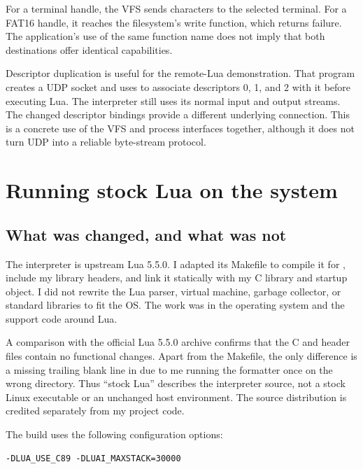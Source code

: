 \documentclass[11pt,a4paper]{scrartcl}
\newcommand{\code}[1]{\texttt{\detokenize{#1}}}
\begin{document}
For a terminal handle, the VFS sends characters to the selected terminal.
For a FAT16 handle, it reaches the filesystem's write function, which
returns failure. The application's use of the same function name does
not imply that both destinations offer identical capabilities.

Descriptor duplication is useful for the remote-Lua demonstration. That
program creates a UDP socket and uses \code{dup2} to associate descriptors
0, 1, and 2 with it before executing Lua. The interpreter still uses its
normal input and output streams. The changed descriptor bindings provide
a different underlying connection. This is a concrete use of the VFS and
process interfaces together, although it does not turn UDP into a reliable
byte-stream protocol.

\section{Running stock Lua on the system}
\label{sec:lua}

\subsection{What was changed, and what was not}

The interpreter is upstream Lua 5.5.0. I adapted its Makefile to compile
it for \code{i386-elf}, include my library headers, and link it statically
with my C library and startup object. I did not rewrite the Lua parser,
virtual machine, garbage collector, or standard libraries to fit the OS.
The work was in the operating system and the support code around Lua.

A comparison with the official Lua 5.5.0 archive confirms that the C and
header files contain no functional changes. Apart from the Makefile, the
only difference is a missing trailing blank line in \code{luaconf.h}
due to me running the formatter once on the wrong directory.
Thus ``stock Lua'' describes the interpreter source, not a stock Linux
executable or an unchanged host environment. The source distribution is
credited separately from my project code.\cite{lua-source}

The build uses the following configuration options:

\par\medskip
\noindent\begin{minipage}{\linewidth}
\begin{lstlisting}
-DLUA_USE_C89 -DLUAI_MAXSTACK=30000
\end{lstlisting}
\end{minipage}
\par\medskip
\end{document}

